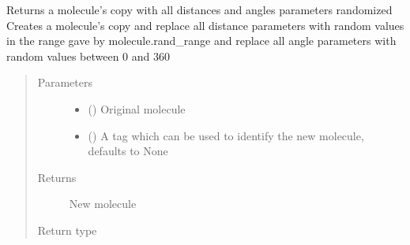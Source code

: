\documentclass[letterpaper,10pt,english]{sphinxmanual}
\begin{document}
\begin{fulllineitems}
\label{\detokenize{molecular:molecular.randomize}}
\sphinxAtStartPar
Returns a molecule’s copy with all distances and angles parameters randomized
Creates a molecule’s copy and replace all distance parameters with random values in the range gave by
molecule.rand\_range and replace all angle parameters with random values between 0 and 360
\begin{quote}\begin{description}
\item[{Parameters}] \leavevmode\begin{itemize}
\item {} 
\sphinxAtStartPar
{} ({\hyperref[\detokenize{molecular:molecular.Molecule}]{}}) \textendash{} Original molecule

\item {} 
\sphinxAtStartPar
{} (\sphinxstyleliteralemphasis{\sphinxupquote{, }}) \textendash{} A tag which can be used to identify the new molecule, defaults to None

\end{itemize}

\item[{Returns}] \leavevmode
\sphinxAtStartPar
New molecule

\item[{Return type}] \leavevmode
\sphinxAtStartPar
{\hyperref[\detokenize{molecular:molecular.Molecule}]{}}

\end{description}\end{quote}

\end{fulllineitems}

\end{document}
